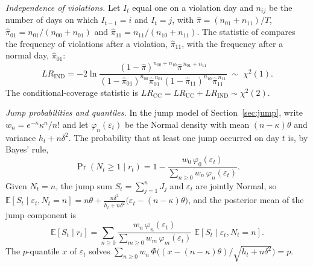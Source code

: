 \documentclass[11pt,a4paper]{article}
\newcommand{\E}{\mathbb{E}}
\begin{document}
\emph{Independence of violations.} Let $I_t$ equal one on a violation day and $n_{ij}$ be the number of days on which $I_{t-1}=i$ and $I_t=j$, with $\hat\pi=(n_{01}+n_{11})/T$, $\hat\pi_{01}=n_{01}/(n_{00}+n_{01})$ and $\hat\pi_{11}=n_{11}/(n_{10}+n_{11})$. The statistic of \citet{christoffersen1998} compares the frequency of violations after a violation, $\hat\pi_{11}$, with the frequency after a normal day, $\hat\pi_{01}$:
\begin{equation}
LR_{\mathrm{IND}}=-2\ln\frac{(1-\hat\pi)^{n_{00}+n_{10}}\hat\pi^{\,n_{01}+n_{11}}}{(1-\hat\pi_{01})^{n_{00}}\hat\pi_{01}^{\,n_{01}}(1-\hat\pi_{11})^{n_{10}}\hat\pi_{11}^{\,n_{11}}}\;\sim\;\chi^2(1).
\end{equation}
The conditional-coverage statistic is $LR_{\mathrm{CC}}=LR_{\mathrm{UC}}+LR_{\mathrm{IND}}\sim\chi^2(2)$.

\emph{Jump probabilities and quantiles.} In the jump model of Section~\ref{sec:jump}, write $w_n=e^{-\kappa}\kappa^{n}/n!$ and let $\varphi_n(\varepsilon_t)$ be the Normal density with mean $(n-\kappa)\theta$ and variance $h_t+n\delta^2$. The probability that at least one jump occurred on day $t$ is, by Bayes' rule,
\begin{equation}
\Pr(N_t\ge 1\mid r_t)=1-\frac{w_0\,\varphi_0(\varepsilon_t)}{\sum_{n\ge0}w_n\,\varphi_n(\varepsilon_t)} .
\end{equation}
Given $N_t=n$, the jump sum $S_t=\sum_{j=1}^{n}J_j$ and $\varepsilon_t$ are jointly Normal, so $\E[S_t\mid\varepsilon_t,N_t=n]=n\theta+\frac{n\delta^2}{h_t+n\delta^2}\bigl(\varepsilon_t-(n-\kappa)\theta\bigr)$, and the posterior mean of the jump component is
\begin{equation}
\E[S_t\mid r_t]=\sum_{n\ge0}\frac{w_n\,\varphi_n(\varepsilon_t)}{\sum_{m\ge0}w_m\,\varphi_m(\varepsilon_t)}\;\E[S_t\mid\varepsilon_t,N_t=n] .
\end{equation}
The $p$-quantile $x$ of $\varepsilon_t$ solves $\sum_{n\ge0}w_n\,\Phi\bigl((x-(n-\kappa)\theta)/\sqrt{h_t+n\delta^2}\bigr)=p$.
\end{document}
